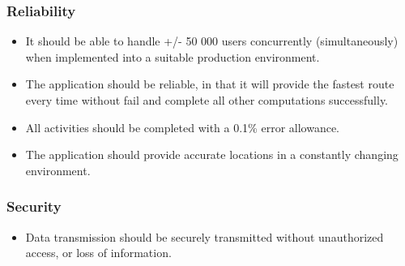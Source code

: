\documentclass{article}
\begin{document}
			\subsubsection{Reliability} 
			\begin{itemize}
			\item It should be able to handle +/- 50 000 users concurrently (simultaneously) when implemented into a suitable production environment. 
			\item The application should be reliable, in that it will provide the fastest route every time without fail and complete all other computations successfully. 
			\item All activities should be completed with a 0.1\% error allowance.
			\item The application should provide accurate locations in a constantly changing environment.\\
			\end{itemize}
			\subsubsection{Security}
			\begin{itemize}
			\item Data transmission should be securely transmitted without unauthorized access, or loss of information.\\
			\end{itemize}

	
	
\end{document}
